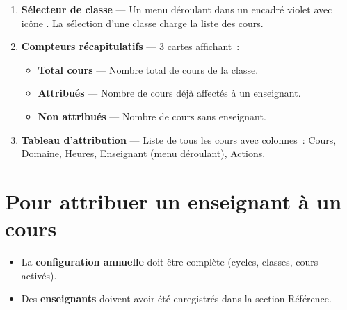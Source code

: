 \documentclass[12pt,a4paper]{report}
\begin{document}
\begin{enumerate}[leftmargin=1.2cm]
  \item \textbf{S\'electeur de classe} --- Un menu d\'eroulant dans un encadr\'e violet avec ic\^one \faChalkboard. La s\'election d'une classe charge la liste des cours.
  \item \textbf{Compteurs r\'ecapitulatifs} --- 3 cartes affichant~:
  \begin{itemize}
    \item \textcolor{emerald}{\textbf{Total cours}} --- Nombre total de cours de la classe.
    \item \textcolor{sky}{\textbf{Attribu\'es}} --- Nombre de cours d\'ej\`a affect\'es \`a un enseignant.
    \item \textcolor{rose}{\textbf{Non attribu\'es}} --- Nombre de cours sans enseignant.
  \end{itemize}
  \item \textbf{Tableau d'attribution} --- Liste de tous les cours avec colonnes~: Cours, Domaine, Heures, Enseignant (menu d\'eroulant), Actions.
\end{enumerate}



\section{Pour attribuer un enseignant \`a un cours}

\begin{prerequis}
\begin{itemize}
  \item La \textbf{configuration annuelle} doit \^etre compl\`ete (cycles, classes, cours activ\'es).
  \item Des \textbf{enseignants} doivent avoir \'et\'e enregistr\'es dans la section R\'ef\'erence.
\end{itemize}
\end{prerequis}
\end{document}
